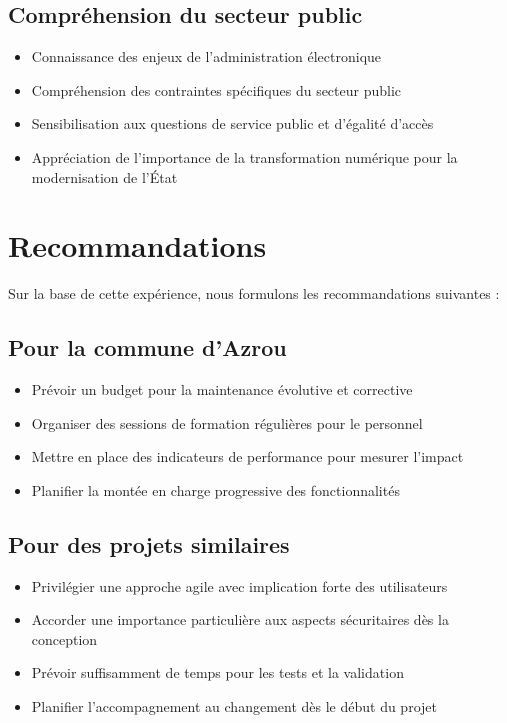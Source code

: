 \subsection*{Compréhension du secteur public}

\begin{itemize}
    \item Connaissance des enjeux de l'administration électronique
    \item Compréhension des contraintes spécifiques du secteur public
    \item Sensibilisation aux questions de service public et d'égalité d'accès
    \item Appréciation de l'importance de la transformation numérique pour la modernisation de l'État
\end{itemize}

\section*{Recommandations}

Sur la base de cette expérience, nous formulons les recommandations suivantes :

\subsection*{Pour la commune d'Azrou}

\begin{itemize}
    \item Prévoir un budget pour la maintenance évolutive et corrective
    \item Organiser des sessions de formation régulières pour le personnel
    \item Mettre en place des indicateurs de performance pour mesurer l'impact
    \item Planifier la montée en charge progressive des fonctionnalités
\end{itemize}

\subsection*{Pour des projets similaires}

\begin{itemize}
    \item Privilégier une approche agile avec implication forte des utilisateurs
    \item Accorder une importance particulière aux aspects sécuritaires dès la conception
    \item Prévoir suffisamment de temps pour les tests et la validation
    \item Planifier l'accompagnement au changement dès le début du projet
\end{itemize}

